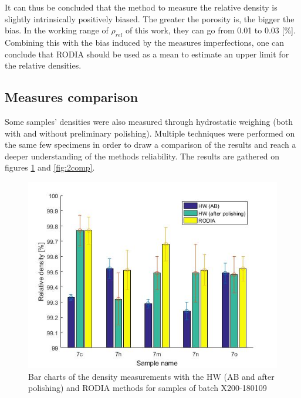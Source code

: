 It can thus be concluded that the method to measure the relative density is slightly intrinsically positively biased. The greater the porosity is, the bigger the bias. In the working range of $\rho_{rel}$ of this work, they can go from 0.01 to 0.03 [\%]. Combining this with the bias induced by the measures imperfections, one can conclude that RODIA should be used as a mean to estimate an upper limit for the relative densities.

\subsection{Measures comparison}
Some samples' densities were also measured through hydrostatic weighing (both with and without preliminary polishing). Multiple techniques were performed on the same few specimens in order to draw a comparison of the results and reach a deeper understanding of the methods reliability. The results are gathered on figures \ref{fig:7comp} and \ref{fig:2comp}.\\

\begin{figure}[ht]
	\centering
	\centerline{\includegraphics[scale=0.64]{Images/7comp}}
	\decoRule
	\caption[Bar chart of the density measurements with the HW (AB and after polishing) and RODIA methods for samples of batch X200-180109]{Bar charts of the density measurements with the HW (AB and after polishing) and RODIA methods for samples of batch X200-180109}
	\label{fig:7comp}
\end{figure}

